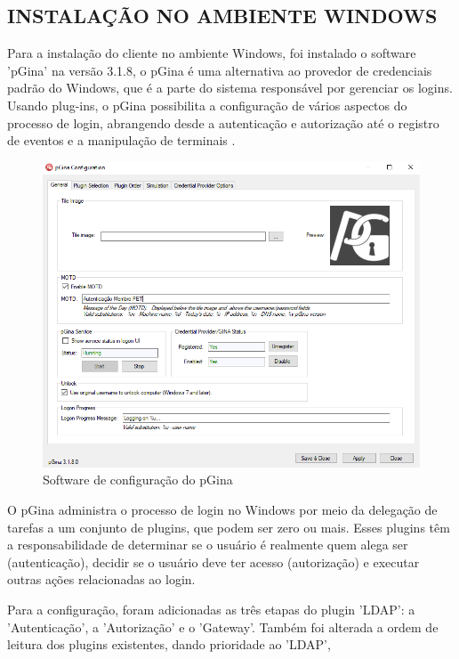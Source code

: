 \subsection{INSTALAÇÃO NO AMBIENTE WINDOWS}

Para a instalação do cliente no ambiente Windows, foi instalado o software 'pGina' na versão 3.1.8, o pGina é uma alternativa ao provedor de credenciais padrão do Windows, que é a parte do sistema responsável por gerenciar os logins. Usando plug-ins, o pGina possibilita a configuração de vários aspectos do processo de login, abrangendo desde a autenticação e autorização até o registro de eventos e a manipulação de terminais  \cite{pginauser}.

\begin{figure}[h]
	\centering
	\includegraphics[scale=0.5]{textuais/PGina.png}
	\caption{Software de configuração do pGina
	\label{fig:pgina1}}
\end{figure}

O pGina administra o processo de login no Windows por meio da delegação de tarefas a um conjunto de plugins, que podem ser zero ou mais. Esses plugins têm a responsabilidade de determinar se o usuário é realmente quem alega ser (autenticação), decidir se o usuário deve ter acesso (autorização) e executar outras ações relacionadas ao login.

Para a configuração, foram adicionadas as três etapas do plugin 'LDAP': a 'Autenticação', a 'Autorização' e o 'Gateway'. Também foi alterada a ordem de leitura dos plugins existentes, dando prioridade ao 'LDAP', 

